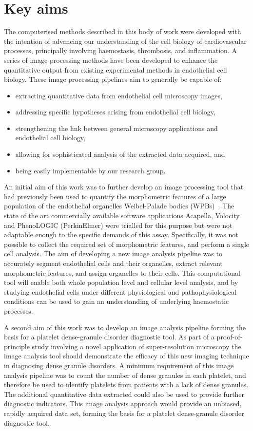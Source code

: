 \section{Key aims}
\label{introduction:key_aims}
The computerised methods described in this body of work were developed with the intention of advancing our understanding of the cell biology of cardiovascular processes, principally involving haemostasis, thrombosis, and inflammation. A series of image processing methods have been developed to enhance the quantitative output from existing experimental methods in endothelial cell biology. These image processing pipelines aim to generally be capable of:
\begin{itemize}
	\item extracting quantitative data from endothelial cell microscopy images,
	\item addressing specific hypotheses arising from endothelial cell biology,
	\item strengthening the link between general microscopy applications and endothelial cell biology,
	\item allowing for sophisticated analysis of the extracted data acquired, and
	\item being easily implementable by our research group.
\end{itemize}

An initial aim of this work was to further develop an image processing tool that had previously been used to quantify the morphometric features of a large population of the endothelial organelles Weibel-Palade bodies (WPBs)~\cite{Ferraro2014}. The state of the art commercially available software applications Acapella, Volocity and PhenoLOGIC (PerkinElmer) were trialled for this purpose but were not adaptable enough to the specific demands of this assay. Specifically, it was not possible to collect the required set of morphometric features, and perform a single cell analysis. The aim of developing a new image analysis pipeline was to accurately segment endothelial cells and their organelles, extract relevant morphometric features, and assign organelles to their cells. This computational tool will enable both whole population level and cellular level analysis, and by studying endothelial cells under different physiological and pathophysiological conditions can be used to gain an understanding of underlying haemostatic processes.

A second aim of this work was to develop an image analysis pipeline forming the basis for a platelet dense-granule disorder diagnostic tool. As part of a proof-of-principle study involving a novel application of super-resolution microscopy the image analysis tool should demonstrate the efficacy of this new imaging technique in diagnosing dense granule disorders. A minimum requirement of this image analysis pipeline was to count the number of dense granules in each platelet, and therefore be used to identify platelets from patients with a lack of dense granules. The additional quantitative data extracted could also be used to provide further diagnostic indicators. 
This image analysis approach would provide an unbiased, rapidly acquired data set, forming the basis for a platelet dense-granule disorder diagnostic tool.

